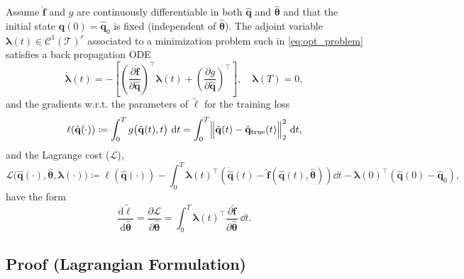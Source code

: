 \begin{theorem}
    \label{thm:adjoint_method}
    Assume $\hat{\mathbf{f}}$ and $g$ are continuously differentiable in both $\hat{\mathbf{q}}$ and $\hat{\bm{\theta}}$ and that the initial state $\hat{\mathbf{q}}(0)=\hat{\mathbf{q}}_0$ is fixed (independent of $\hat{\bm{\theta}}$). The adjoint variable $\bm{\lambda}(t)\in\mathcal{C}^1(\mathcal{T})^r$ associated to a minimization problem such in \eqref{eq:opt_problem} satisfies a back propagation ODE\\ 
    \begin{equation}
        \dot{\bm{\lambda}}(t) = -\left[ \left(\dfrac{\partial \hat{\mathbf{f}}}{\partial\hat{\mathbf{q}}}\right)^{\top}\bm{\lambda}(t) + \left( \dfrac{\partial g}{\partial \hat{\mathbf{q}}} \right)^{\top} \right],\quad\bm{\lambda}(T)=0,
        \label{eq:adjoint_eqs}
    \end{equation}
    and the gradients w.r.t. the parameters of $\tilde\ell$ for the training loss\\
    \begin{equation*}
        \ell(\hat{\mathbf{q}}(\cdot)) \coloneqq \displaystyle\int_0^T g\bigl(\hat{\mathbf{q}}(t),t\bigr)~\dd t = \int_0^T \Bigl\|\hat{\mathbf{q}}(t) - \hat{\mathbf{q}}_{\mathrm{true}}(t)\Bigr\|_2^2~\dd t,
    \end{equation*}
    and the Lagrange cost ($\mathscr{L}$),\\
    \begin{equation*}
        \mathscr{L}\bigl(\hat{\mathbf{q}}(\cdot),\hat{\bm{\theta}},\bm{\lambda}(\cdot)\bigr) \coloneqq \ell(\hat{\mathbf{q}}(\cdot)) - \int_0^T \bm{\lambda}(t)^{\top}\left( \dot{\hat{\mathbf{q}}}(t)-\hat{\mathbf{f}}(\hat{\mathbf{q}}(t),\hat{\bm{\theta}}) \right)\dd t - \bm{\lambda}(0)^{\top}(\hat{\mathbf{q}}(0)-\hat{\mathbf{q}}_0),
        \label{eq:lagrange_cost2}
    \end{equation*}
    have the form\\
    \begin{equation}
        \dfrac{\mathrm{d} \tilde{\ell}}{\mathrm{d} \hat{\bm{\theta}}} = \dfrac{\partial \mathscr{L}}{\partial\hat{\bm{\theta}}} = \int_0^T \bm{\lambda}(t)^{\top}\dfrac{\partial\hat{\mathbf{f}}}{\partial\hat{\bm{\theta}}}~\dd t.
        \label{eq:gradient_lagrange}
    \end{equation}
\end{theorem}

\subsection*{Proof (Lagrangian Formulation)}

